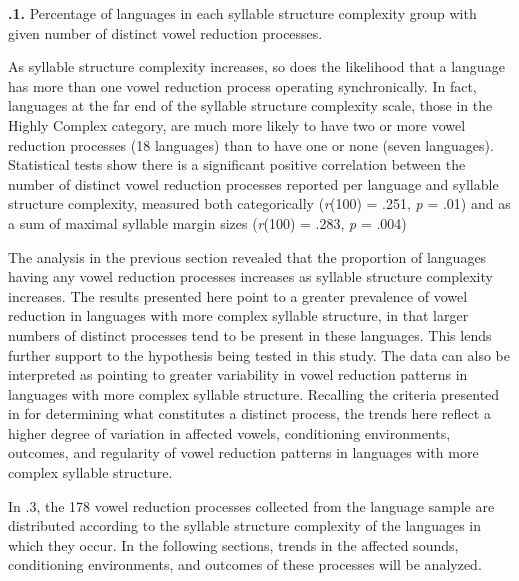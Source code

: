 \textbf{.1.} Percentage of languages in each syllable structure complexity group with given number of distinct vowel reduction processes.

  As syllable structure complexity increases, so does the likelihood that a language has more than one vowel reduction process operating synchronically. In fact, languages at the far end of the syllable structure complexity scale, those in the Highly Complex category, are much more likely to have two or more vowel reduction processes (18 languages) than to have one or none (seven languages). Statistical tests show there is a significant positive correlation between the number of distinct vowel reduction processes reported per language and syllable structure complexity, measured both categorically (\textit{r}(100) = .251, \textit{p} = .01) and as a sum of maximal syllable margin sizes (\textit{r}(100) = .283, \textit{p} = .004)

  The analysis in the previous section revealed that the proportion of languages having any vowel reduction processes increases as syllable structure complexity increases. The results presented here point to a greater prevalence of vowel reduction in languages with more complex syllable structure, in that larger numbers of distinct processes tend to be present in these languages. This lends further support to the hypothesis being tested in this study. The data can also be interpreted as pointing to greater variability in vowel reduction patterns in languages with more complex syllable structure. Recalling the criteria presented in  for determining what constitutes a distinct process, the trends here reflect a higher degree of variation in affected vowels, conditioning environments, outcomes, and regularity of vowel reduction patterns in languages with more complex syllable structure.

  In .3, the 178 vowel reduction processes collected from the language sample are distributed according to the syllable structure complexity of the languages in which they occur. In the following sections, trends in the affected sounds, conditioning environments, and outcomes of these processes will be analyzed.

